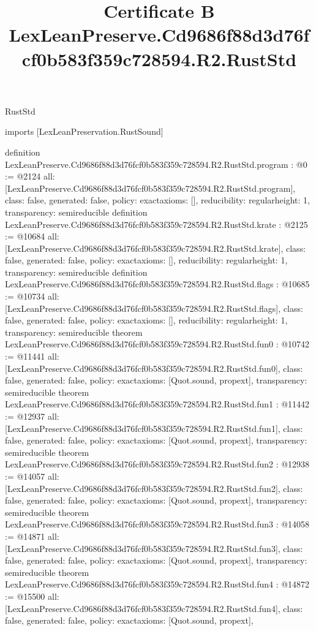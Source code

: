\begin{lexlean}{RustStd}
\title{Certificate B LexLeanPreserve.Cd9686f88d3d76fcf0b583f359c728594.R2.RustStd}
\begin{coremodule}
imports [LexLeanPreservation.RustSound]

definition LexLeanPreserve.Cd9686f88d3d76fcf0b583f359c728594.R2.RustStd.program : @0 := @2124 {
  all: [LexLeanPreserve.Cd9686f88d3d76fcf0b583f359c728594.R2.RustStd.program],
  class: false,
  generated: false,
  policy: exact{axioms: []},
  reducibility: regular{height: 1},
  transparency: semireducible
}
definition LexLeanPreserve.Cd9686f88d3d76fcf0b583f359c728594.R2.RustStd.krate : @2125 := @10684 {
  all: [LexLeanPreserve.Cd9686f88d3d76fcf0b583f359c728594.R2.RustStd.krate],
  class: false,
  generated: false,
  policy: exact{axioms: []},
  reducibility: regular{height: 1},
  transparency: semireducible
}
definition LexLeanPreserve.Cd9686f88d3d76fcf0b583f359c728594.R2.RustStd.flags : @10685 := @10734 {
  all: [LexLeanPreserve.Cd9686f88d3d76fcf0b583f359c728594.R2.RustStd.flags],
  class: false,
  generated: false,
  policy: exact{axioms: []},
  reducibility: regular{height: 1},
  transparency: semireducible
}
theorem LexLeanPreserve.Cd9686f88d3d76fcf0b583f359c728594.R2.RustStd.fun0 : @10742 := @11441 {
  all: [LexLeanPreserve.Cd9686f88d3d76fcf0b583f359c728594.R2.RustStd.fun0],
  class: false,
  generated: false,
  policy: exact{axioms: [Quot.sound, propext]},
  transparency: semireducible
}
theorem LexLeanPreserve.Cd9686f88d3d76fcf0b583f359c728594.R2.RustStd.fun1 : @11442 := @12937 {
  all: [LexLeanPreserve.Cd9686f88d3d76fcf0b583f359c728594.R2.RustStd.fun1],
  class: false,
  generated: false,
  policy: exact{axioms: [Quot.sound, propext]},
  transparency: semireducible
}
theorem LexLeanPreserve.Cd9686f88d3d76fcf0b583f359c728594.R2.RustStd.fun2 : @12938 := @14057 {
  all: [LexLeanPreserve.Cd9686f88d3d76fcf0b583f359c728594.R2.RustStd.fun2],
  class: false,
  generated: false,
  policy: exact{axioms: [Quot.sound, propext]},
  transparency: semireducible
}
theorem LexLeanPreserve.Cd9686f88d3d76fcf0b583f359c728594.R2.RustStd.fun3 : @14058 := @14871 {
  all: [LexLeanPreserve.Cd9686f88d3d76fcf0b583f359c728594.R2.RustStd.fun3],
  class: false,
  generated: false,
  policy: exact{axioms: [Quot.sound, propext]},
  transparency: semireducible
}
theorem LexLeanPreserve.Cd9686f88d3d76fcf0b583f359c728594.R2.RustStd.fun4 : @14872 := @15500 {
  all: [LexLeanPreserve.Cd9686f88d3d76fcf0b583f359c728594.R2.RustStd.fun4],
  class: false,
  generated: false,
  policy: exact{axioms: [Quot.sound, propext]},
}
\end{coremodule}
\end{lexlean}
